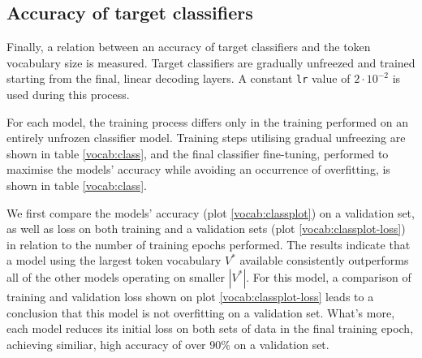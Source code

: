 \subsection{Accuracy of target classifiers}
\label{vocab:target-classifiers-results}

Finally, a relation between an accuracy of target classifiers and the token vocabulary size is measured. Target classifiers are gradually unfreezed and trained starting from the final, linear decoding layers. A constant \lstinline{lr} value of $2\cdot10^{-2}$ is used during this process.

For each model, the training process differs only in the training performed on an entirely unfrozen classifier model. Training steps utilising gradual unfreezing are shown in table \ref{vocab:class}, and the final classifier fine-tuning, performed to maximise the models' accuracy while avoiding an occurrence of overfitting, is shown in table \ref{vocab:class}.

We first compare the models' accuracy (plot \ref{vocab:classplot}) on a validation set, as well as loss on both training and a validation sets (plot \ref{vocab:classplot-loss}) in relation to the number of training epochs performed. The results indicate that a model using the largest token vocabulary $V^*$ available consistently outperforms all of the other models operating on smaller $|V^*|$. For this model, a comparison of training and validation loss shown on plot \ref{vocab:classplot-loss} leads to a conclusion that this model is not overfitting on a validation set. What's more, each model reduces its initial loss on both sets of data in the final training epoch, achieving similiar, high accuracy of over 90\% on a validation set.

